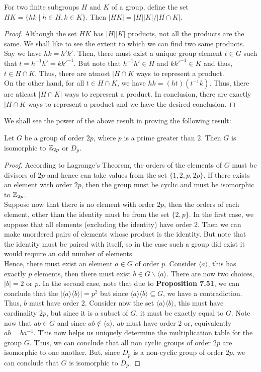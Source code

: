 \begin{proposition}
	For two finite subgroups $H$ and $K$ of a group, define the set $HK=\{hk\mid h\in H, k\in K\}$. Then $|HK|=|H||K|/|H\cap K|$.
\end{proposition}
\begin{proof}
	Although the set $HK$ has $|H||K|$ products, not all the products are the same. We shall like to see the extent to which we can find two same products. Say we have $hk=h'k'$. Then, there must exist a unique group element $t\in G$ such that $t=h^{-1}h'=kk'^{-1}$. But note that $h^{-1}h'\in H$ and $kk'^{-1}\in K$ and thus, $t\in H\cap K$. Thus, there are atmost $|H\cap K$ ways to represent a product.\\
	On the other hand, for all $t\in H\cap K$, we have $hk=(ht)(t^{-1}k)$. Thus, there are atleast $|H\cap K|$ ways to represent a product. In conclusion, there are exactly $|H\cap K$ ways to represent a product and we have the desired conclusion. 
\end{proof}
We shall see the power of the above result in proving the following result:
\begin{proposition}
	Let $G$ be a group of order $2p$, where $p$ is a prime greater than $2$. Then $G$ is isomorphic to $\mathbb{Z}_{2p}$ or $D_p$.
\end{proposition}
\begin{proof}
	According to Lagrange's Theorem, the orders of the elements of $G$ must be divisors of $2p$ and hence can take values from the set $\{1,2,p,2p\}$. If there exists an element with order $2p$, then the group must be cyclic and must be isomorphic to $\mathbb{Z}_{2p}$.\\
	Suppose now that there is no element with order $2p$, then the orders of each element, other than the identity must be from the set $\{2,p\}$. In the first case, we suppose that all elements (excluding the identity) have order $2$. Then we can make unordered pairs of elements whose product is the identity. But note that the identity must be paired with itself, so in the case such a group did exist it would require an odd number of elements.\\
	Hence, there must exist an element $a\in G$ of order $p$. Consider $\langle a\rangle$, this has exactly $p$ elements, then there must exist $b\in G\backslash\langle a\rangle$. There are now two choices, $|b|=2$ or $p$. In the second case, note that due to \textbf{Proposition 7.51}, we can conclude that the $|\langle a\rangle\langle b\rangle|=p^2$ but since $\langle a\rangle\langle b\rangle\subseteq G$, we have a contradiction.\\ 
	Thus, $b$ must have order $2$. Consider now the set $\langle a\rangle\langle b\rangle$, this must have cardinality $2p$, but since it is a subset of $G$, it must be exactly equal to $G$. Note now that $ab\in G$ and since $ab\notin\langle a\rangle$, $ab$ must have order $2$ or, equivalently $ab = ba^{-1}$. This now helps us uniquely determine the multiplication table for the group $G$. Thus, we can conclude that all non cyclic groups of order $2p$ are isomorphic to one another. But, since $D_p$ is a non-cyclic group of order $2p$, we can conclude that $G$ is isomorphic to $D_p$.
\end{proof}



